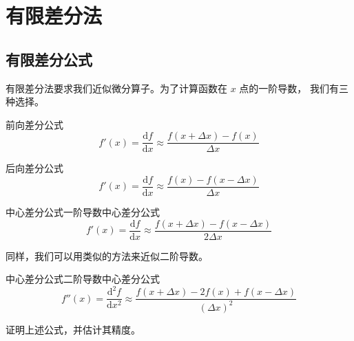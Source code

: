 \chapter{有限差分法}

\section{有限差分公式}

\par 有限差分法要求我们近似微分算子。为了计算函数在 $x$ 点的一阶导数，
我们有三种选择。

\begin{theorem}{前向差分公式}
    \begin{equation}
        f'(x)=\frac{\text{d}f}{\text{d}x}
            \approx\frac{f(x+\Delta x)-f(x)}{\Delta x}
    \end{equation}
\end{theorem}

\begin{theorem}{后向差分公式}
    \begin{equation}
        f'(x)=\frac{\text{d}f}{\text{d}x}
            \approx\frac{f(x)-f(x-\Delta x)}{\Delta x}
    \end{equation}
\end{theorem}

\begin{theorem}{中心差分公式}{一阶导数中心差分公式}
    \begin{equation}
        f'(x)=\frac{\text{d}f}{\text{d}x}
            \approx\frac{f(x+\Delta x)-f(x-\Delta x)}{2\Delta x}
    \end{equation}
\end{theorem}

\par 同样，我们可以用类似的方法来近似二阶导数。

\begin{theorem}{中心差分公式}{二阶导数中心差分公式}
    \begin{equation}
        f''(x)=\frac{\text{d}^2f}{\text{d}x^2}
            \approx
            \frac{f(x+\Delta x)-2f(x)+f(x-\Delta x)}{(\Delta x)^2}
    \end{equation}
\end{theorem}

\begin{exercise}
    证明上述公式，并估计其精度。  
\end{exercise}

